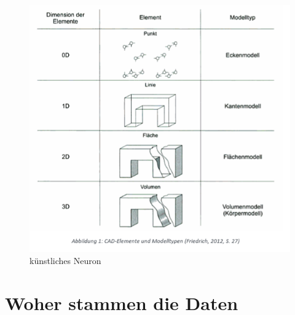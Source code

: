 \documentclass{llncs}
\begin{document}
\begin{figure}[htbp] 
	\centering
	\includegraphics[width=1.0\textwidth]{datenformat.png}
	\caption{künstliches Neuron}
	\label{fig:Bild1}
\end{figure}
\section{Woher stammen die Daten}
\end{document}
